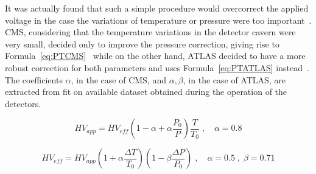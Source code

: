 	It was actually found that such a simple procedure would overcorrect the applied voltage in the case the variations of temperature or pressure were too important~\cite{ABBRESCIA2013,FILIP2014,BIANCO2007,BIANCO2009}. CMS, considering that the temperature variations in the detector cavern were very small, decided only to improve the pressure correction, giving rise to Formula~\ref{eq:PTCMS}~\cite{ABBRESCIA2013} while on the other hand, ATLAS decided to have a more robust correction for both parameters and uses Formula~\ref{eq:PTATLAS} instead~\cite{BIANCO2009}. The coefficients $\alpha$, in the case of CMS, and $\alpha,\beta$, in the case of ATLAS, are extracted from fit on available dataset obtained during the operation of the detectors.
	
	\begin{equation}
	\label{eq:PTCMS}
	HV_{app} = HV_{eff}\left( 1 - \alpha + \alpha\frac{P_0}{P} \right) \frac{T}{T_0} \; , \quad \alpha = 0.8
	\end{equation}
	
	\begin{equation}
	\label{eq:PTATLAS}
	HV_{eff} = HV_{app}\left( 1 + \alpha\frac{\Delta T}{T_0} \right) \left( 1 - \beta\frac{\Delta P}{P_0} \right) \; , \quad \alpha = 0.5 \; , \; \beta = 0.71
	\end{equation}

\clearpage{\pagestyle{empty}\cleardoublepage}